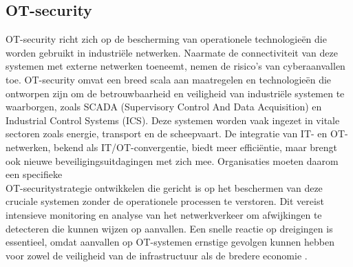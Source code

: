 \subsection{OT-security}
OT-security richt zich op de bescherming van operationele technologieën die worden gebruikt in industriële netwerken. Naarmate de connectiviteit van deze systemen 
met externe netwerken toeneemt, nemen de risico’s van cyberaanvallen toe. OT-security omvat een breed scala aan maatregelen en technologieën die ontworpen zijn om 
de betrouwbaarheid en veiligheid van industriële systemen te waarborgen, zoals SCADA (Supervisory Control And Data Acquisition) en Industrial Control Systems (ICS). Deze systemen worden vaak ingezet in vitale 
sectoren zoals energie, transport en de scheepvaart. De integratie van IT- en OT-netwerken, bekend als IT/OT-convergentie, biedt meer efficiëntie, maar brengt ook nieuwe 
beveiligingsuitdagingen met zich mee. Organisaties moeten daarom een specifieke \\OT-securitystrategie ontwikkelen die gericht is op het beschermen van deze cruciale systemen 
zonder de operationele processen te verstoren. Dit vereist intensieve monitoring en analyse van het netwerkverkeer om afwijkingen te detecteren die kunnen wijzen op aanvallen. 
Een snelle reactie op dreigingen is essentieel, omdat aanvallen op OT-systemen ernstige gevolgen kunnen hebben voor zowel de veiligheid van de infrastructuur als de bredere economie \autocite{Nomios2024}.



